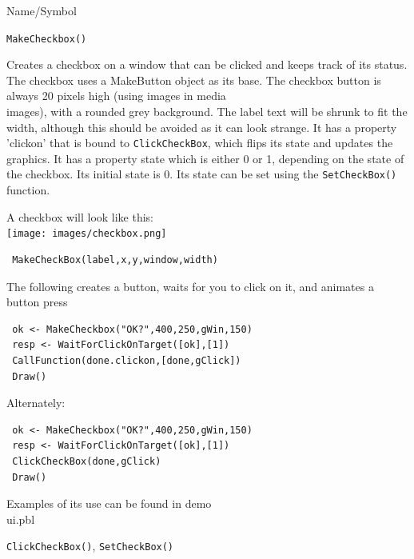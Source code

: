 \begin{desc}{Name/Symbol}
\item[Name/Symbol]  	\verb+MakeCheckbox()+

\item[Description]	
Creates a checkbox on a window that can be clicked and keeps track of its status. The checkbox uses a MakeButton object as its base.  The checkbox button is always 20 pixels high (using images in media\\images), with a rounded grey background.  The label text will be shrunk to fit the width, although this should be avoided as it can look strange.
It has a property 'clickon' that is bound to \texttt{ClickCheckBox}, which flips its state and updates the graphics. It has a property state which is either 0 or 1, depending on the state of the checkbox. Its initial state is 0. Its state can be set using the \texttt{SetCheckBox()} function.

A checkbox will look like this:\\
 \texttt{[image: images/checkbox.png]}

\item[Usage]
\begin{verbatim}
 MakeCheckBox(label,x,y,window,width)
 \end{verbatim}

\item[Example]      	
The following creates a button, waits for you to click on it, and animates a button press

\begin{verbatim}
 ok <- MakeCheckbox("OK?",400,250,gWin,150)
 resp <- WaitForClickOnTarget([ok],[1])
 CallFunction(done.clickon,[done,gClick]) 
 Draw()
\end{verbatim}

Alternately:

\begin{verbatim}
 ok <- MakeCheckbox("OK?",400,250,gWin,150)
 resp <- WaitForClickOnTarget([ok],[1])
 ClickCheckBox(done,gClick) 
 Draw()
\end{verbatim}


Examples of its use can be found in demo\\ui.pbl
\item[See Also]	\verb+ClickCheckBox()+, \verb+SetCheckBox()+
\end{desc}



